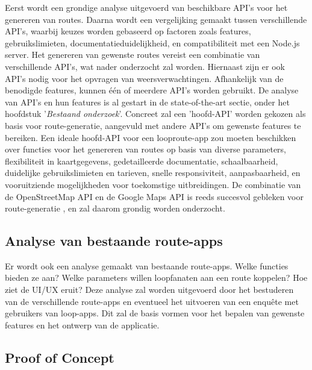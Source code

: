 Eerst wordt een grondige analyse uitgevoerd van beschikbare API's voor het genereren van routes.
Daarna wordt een vergelijking gemaakt tussen verschillende API's,
waarbij keuzes worden gebaseerd op factoren zoals features, gebruikslimieten,
documentatieduidelijkheid, en compatibiliteit met een Node.js server.
Het genereren van gewenste routes vereist een combinatie van verschillende API's,
wat nader onderzocht zal worden. Hiernaast zijn er ook API's nodig voor het opvragen van weersverwachtingen.
Afhankelijk van de benodigde features, kunnen één of meerdere API's worden gebruikt.
De analyse van API's en hun features is al gestart in de state-of-the-art sectie,
onder het hoofdstuk '\emph{Bestaand onderzoek}'.
Concreet zal een 'hoofd-API' worden gekozen als basis voor route-generatie,
aangevuld met andere API's om gewenste features te bereiken.
Een ideale hoofd-API voor een looproute-app zou moeten beschikken
over functies voor het genereren van routes op basis van diverse parameters, flexibiliteit in kaartgegevens,
gedetailleerde documentatie, schaalbaarheid, duidelijke gebruikslimieten en tarieven, snelle responsiviteit,
aanpasbaarheid, en vooruitziende mogelijkheden voor toekomstige uitbreidingen.
De combinatie van de OpenStreetMap API en de Google Maps API is reeds succesvol gebleken voor route-generatie \autocite{Loepp2018},
en zal daarom grondig worden onderzocht.

\subsection{Analyse van bestaande route-apps}

Er wordt ook een analyse gemaakt van bestaande route-apps.
Welke functies bieden ze aan? Welke parameters willen loopfanaten aan een route koppelen? Hoe ziet de UI/UX eruit?
Deze analyse zal worden uitgevoerd door het bestuderen van de verschillende route-apps 
en eventueel het uitvoeren van een enquête met gebruikers van loop-apps.
Dit zal de basis vormen voor het bepalen van gewenste features en het ontwerp van de applicatie. 

\subsection{Proof of Concept}

